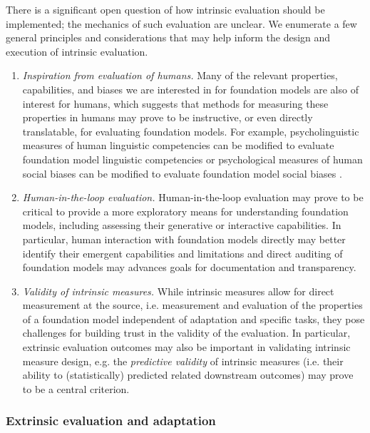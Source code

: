 There is a significant open question of how intrinsic evaluation should be implemented; the mechanics of such evaluation are unclear. We enumerate a few general principles and considerations that may help inform the design and execution of intrinsic evaluation.

\begin{enumerate}
    \item \textit{Inspiration from evaluation of humans.} Many of the relevant properties, capabilities, and biases we are interested in for foundation models are also of interest for humans, which suggests that methods for measuring these properties in humans may prove to be instructive, or even directly translatable, for evaluating foundation models. For example, psycholinguistic measures of human linguistic competencies can be modified to evaluate foundation model linguistic competencies \citep{levy2008, frank2013, linzen2016assessing, ettinger2016, marvin2018, van-schijndel2018, futrell2019, prasad2019, ettinger2020} or psychological measures of human social biases can be modified to evaluate foundation model social biases \citep{greenwald1998, caliskan2017, may2019, guo2020}.
    \item \textit{Human-in-the-loop evaluation.} Human-in-the-loop evaluation may prove to be critical to provide a more exploratory means for understanding foundation models, including assessing their generative or interactive capabilities. In particular, human interaction with foundation models directly may better identify their emergent capabilities and limitations and direct auditing of foundation models \citep[e.g. ][Section~\ref{ethics}]{raji2019} may advances goals for documentation and transparency.
    \item \textit{Validity of intrinsic measures.} While intrinsic measures allow for direct measurement at the source, i.e. measurement and evaluation of the properties of a foundation model independent of adaptation and specific tasks, they pose challenges for building trust in the validity \cite{messick1987, messick1988} of the evaluation. In particular, extrinsic evaluation outcomes may also be important in validating intrinsic measure design, e.g. the \textit{predictive validity} of intrinsic measures (i.e. their ability to (statistically) predicted related downstream outcomes) may prove to be a central criterion. 
\end{enumerate}

\subsubsection{Extrinsic evaluation and adaptation}
\label{sec:evaluation-adaptation}

